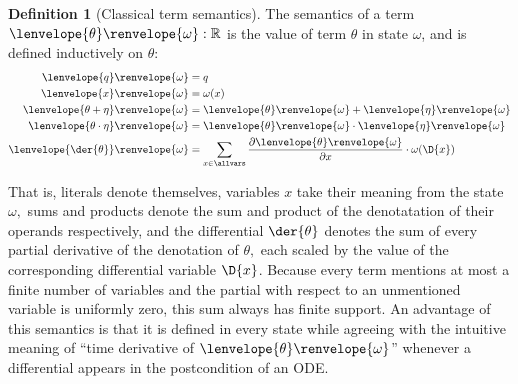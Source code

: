 \documentclass[12pt]{cmuthesis}
\theoremstyle{definition}
\newtheorem{definition}{Definition}
\theoremstyle{remark}
\newcommand{\om}{\omega}
\newcommand{\tint}[2]{\lenvelope{#1}\renvelope{#2}}
\begin{document}
\begin{definition}[Classical term semantics]\label{def:dgl-sem-term}
The semantics of a term $\tint{\theta}{\om} : \mathbb{R}$ is the value of term $\theta$ in state $\om$, and is defined inductively on $\theta$:
\begin{align*}
  \tint{q}{\om} &= q \\
  \tint{x}{\om} &= \om(x)\\
  \tint{\theta + \eta}{\om} &= \tint{\theta}{\om} + \tint{\eta}{\om}\\
  \tint{\theta \cdot \eta}{\om} &= \tint{\theta}{\om} \cdot \tint{\eta}{\om}\\
  \tint{\der{\theta}}{\om} &= \sum_{x \in \allvars} \frac{\partial \tint{\theta}{\om}}{\partial x} \cdot \omega(\D{x})
\end{align*}
\end{definition}
That is, literals denote themselves, variables $x$ take their meaning from the state $\om,$ sums and products denote the sum and product of the denotatation of their operands respectively, and the differential $\der{\theta}$ denotes the sum of every partial derivative of the denotation of $\theta,$ each scaled by the value of the corresponding differential variable $\D{x}$.
Because every term mentions at most a finite number of variables and the partial with respect to an unmentioned variable is uniformly zero, this sum always has finite support.
An advantage of this semantics is that it is defined in every state while agreeing with the intuitive meaning of ``time derivative of $\tint{\theta}{\om}$'' whenever a differential appears in the postcondition of an ODE.
\end{document}
